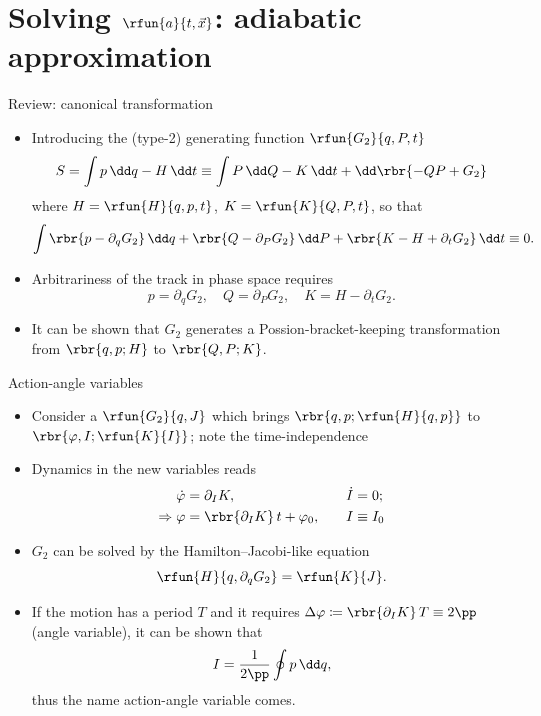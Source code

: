 \documentclass{beamer}
\begin{document}
\section{Solving $\rfun{a}{t,\vec{x}}$: adiabatic approximation}

\begin{frame}{Review: canonical transformation}
\begin{itemize}
\item Introducing the (type-2) generating function $\rfun{G_2}{q, P, t}$
\begin{equation}
S = \int p\,\dd q - H \,\dd t
\equiv \int P\,\dd Q - K\,\dd t + \dd \rbr{-QP + G_2}
\end{equation}
where $H = \rfun{H}{q, p, t}$, $K = \rfun{K}{Q, P, t}$, so that
\begin{equation}
\int \rbr{p - \partial_q G_2}\,\dd q + \rbr{Q - \partial_P G_2}\,\dd P 
+ \rbr{K - H + \partial_t G_2}\,\dd t\equiv 0.
\end{equation}
\item Arbitrariness of the track in phase space requires
\begin{equation}
p = \partial_q G_2,\quad
Q = \partial_P G_2,\quad
K = H - \partial_t G_2.
\end{equation}
\item It can be shown that $G_2$ generates a Possion-bracket-keeping 
transformation from $\rbr{q, p; H}$ to $\rbr{Q, P; K}$.
\end{itemize}
\end{frame}

\begin{frame}{Action-angle variables}
\begin{itemize}
\item Consider a $\rfun{G_2}{q, J}$ which brings $\rbr{q, p; \rfun{H}{q, p}}$ 
to $\rbr{\varphi, I; \rfun{K}{I}}$; note the time-independence
\item Dynamics in the new variables reads
\begin{alignat}{3}
\dot \varphi &= \partial_I K,&\quad \dot I &= 0; \\
\Rightarrow \varphi &= \rbr{\partial_I K}\,t+\varphi_0,&\quad I &\equiv I_0
\end{alignat}
\item $G_2$ can be solved by the Hamilton--Jacobi-like equation
\begin{equation}
\rfun{H}{q, \partial_q G_2} = \rfun{K}{J}.
\end{equation}
\item If the motion has a period $T$ and it requires $\Delta \varphi \coloneqq 
\rbr{\partial_I K}\,T \equiv 2\pp$ (angle variable), it can be shown that
\begin{equation}
I = \frac{1}{2\pp}\oint p\,\dd q,
\end{equation}
thus the name action-angle variable comes.

\end{itemize}
\end{frame}
\end{document}
